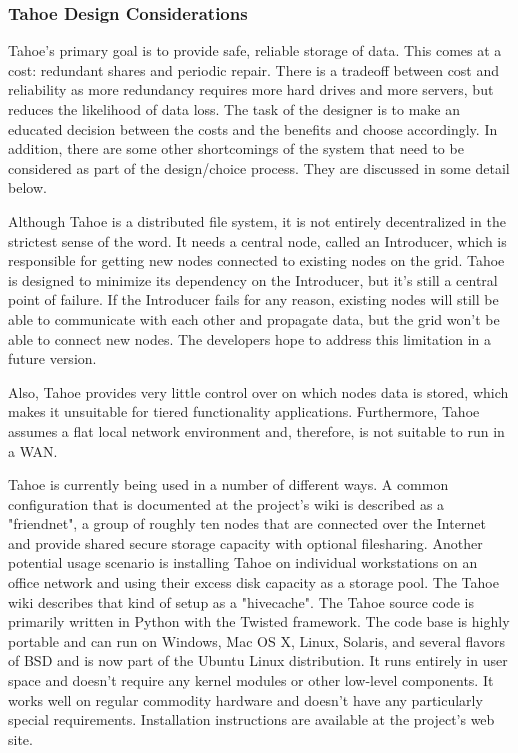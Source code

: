 \documentclass[11pt]{article}
\begin{document}
\subsubsection{Tahoe Design Considerations}
Tahoe's primary goal is to provide safe, reliable storage of data. This comes 
at a cost: redundant shares and periodic repair. There is a tradeoff between 
cost and reliability as more redundancy requires more hard drives and more 
servers, but reduces the likelihood of data loss. The task of the designer 
is to make an educated decision between the costs and the benefits and 
choose accordingly. In addition, there are some other shortcomings of the 
system that need to be considered as part of the design/choice process. They 
are discussed in some detail below.

Although Tahoe is a distributed file system, it is not entirely 
decentralized in the strictest sense of the word. It needs a central node, 
called an Introducer, which is responsible for getting new nodes connected 
to existing nodes on the grid. Tahoe is designed to minimize its dependency 
on the Introducer, but it's still a central point of failure. If the 
Introducer fails for any reason, existing nodes will still be able to 
communicate with each other and propagate data, but the grid won't be able 
to connect new nodes. The developers hope to address this limitation in a 
future version.

Also, Tahoe provides very little control over on which nodes data is 
stored, which makes it unsuitable for tiered functionality applications. 
Furthermore, Tahoe assumes a flat local network environment and, 
therefore, is not suitable to run in a WAN. 

Tahoe is currently being used in a number of different ways. A common 
configuration that is documented at the project's wiki is described as a 
"friendnet", a group of roughly ten nodes that are connected over the 
Internet and provide shared secure storage capacity with optional 
filesharing. Another potential usage scenario is installing Tahoe on 
individual workstations on an office network and using their excess disk 
capacity as a storage pool. The Tahoe wiki describes that kind of setup 
as a "hivecache". The Tahoe source code is primarily written in Python 
with the Twisted framework. The code base is highly portable and can 
run on Windows, Mac OS X, Linux, Solaris, and several flavors of BSD and 
is now part of the Ubuntu Linux distribution. It runs entirely in user 
space and doesn't require any kernel modules or other low-level components. 
It works well on regular commodity hardware and doesn't have any 
particularly special requirements. Installation instructions are available 
at the project's web site.
\end{document}
